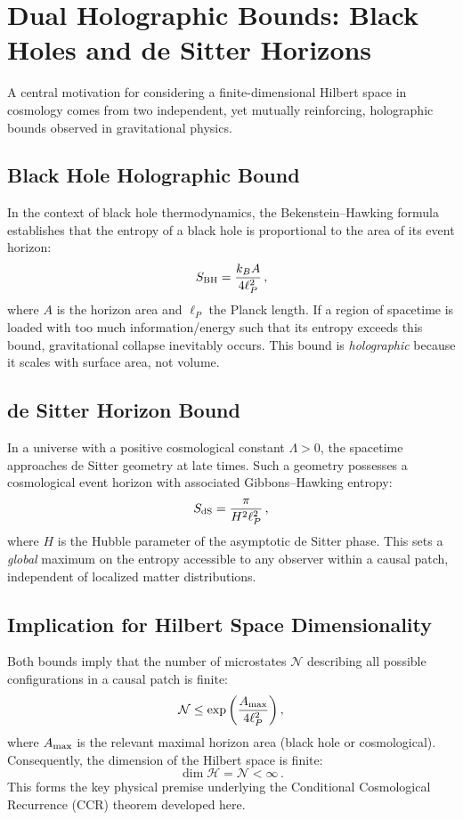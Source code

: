 \documentclass[12pt]{article}
\theoremstyle{remark}
\begin{document}
\section{Dual Holographic Bounds: Black Holes and de Sitter Horizons}
A central motivation for considering a finite-dimensional Hilbert space in cosmology comes from two independent,
yet mutually reinforcing, holographic bounds observed in gravitational physics.

\subsection{Black Hole Holographic Bound}
In the context of black hole thermodynamics, the Bekenstein--Hawking formula establishes that the entropy of a black hole is proportional to the area of its event horizon:
\begin{equation}
S_{\rm BH} = \frac{k_B A}{4 \ell_P^2} \, ,
\end{equation}
where $A$ is the horizon area and $\ell_P$ the Planck length.
If a region of spacetime is loaded with too much information/energy such that its entropy exceeds this bound, gravitational collapse inevitably occurs.
This bound is \emph{holographic} because it scales with surface area, not volume.

\subsection{de Sitter Horizon Bound}
In a universe with a positive cosmological constant $\Lambda > 0$, the spacetime approaches de Sitter geometry at late times.
Such a geometry possesses a cosmological event horizon with associated Gibbons--Hawking entropy:
\begin{equation}
S_{\rm dS} = \frac{\pi}{H^2 \ell_P^2} \, ,
\end{equation}
where $H$ is the Hubble parameter of the asymptotic de Sitter phase.
This sets a \emph{global} maximum on the entropy accessible to any observer within a causal patch, independent of localized matter distributions.

\subsection{Implication for Hilbert Space Dimensionality}
Both bounds imply that the number of microstates $\mathcal{N}$ describing all possible configurations in a causal patch is finite:
\begin{equation}
\mathcal{N} \le \exp\left( \frac{A_{\rm max}}{4 \ell_P^2} \right) ,
\end{equation}
where $A_{\rm max}$ is the relevant maximal horizon area (black hole or cosmological).
Consequently, the dimension of the Hilbert space is finite:
\begin{equation}
\dim \mathcal{H} = \mathcal{N} < \infty \, .
\end{equation}
This forms the key physical premise underlying the Conditional Cosmological Recurrence (CCR) theorem developed here.
\end{document}
